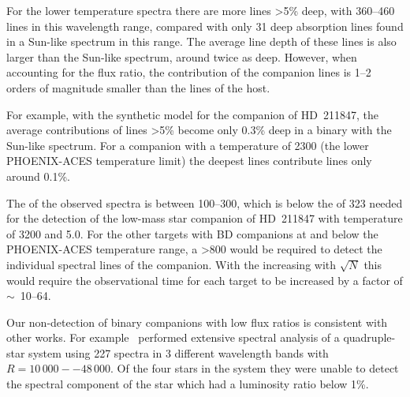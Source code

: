 For the lower temperature spectra there are more lines >5\% deep, with 360--460 lines in this wavelength range, compared with only 31 deep absorption lines found in a Sun-like spectrum in this range.
The average line depth of these lines is also larger than the Sun-like spectrum, around twice as deep.
However, when accounting for the flux ratio, the contribution of the companion lines is 1--2 orders of magnitude smaller than the lines of the host.

For example, with the synthetic model for the companion of {HD~211847}, the average contributions of lines >5\% become only 0.3\% deep in a binary with the Sun-like spectrum.
For a companion with a temperature of 2300\K{} (the lower {PHOENIX-ACES} temperature limit) the deepest lines contribute lines only around 0.1\%.


The \snr{} of the observed spectra is between 100--300, which is below the \snr{} of 323 needed for the detection of the low-mass star companion of {HD~211847} with temperature of 3200\K{} and \logg{} 5.0.
For the other targets with {BD} companions at and below the {PHOENIX-ACES} temperature range, a \snr{} >800  would be required to detect the individual spectral lines of the companion.
With the \snr{} increasing with \(\sqrt{N}\) this would require the observational time for each target to be increased by a factor of \(\sim\)~10--64.

Our non-detection of binary companions with low flux ratios is consistent with other works.
For example~\citet{nemravova_xtauri_2016} performed extensive spectral analysis of a quadruple-star system  using 227 spectra in 3 different wavelength bands with \(R=10\,000--48\,000\).
Of the four stars in the system they were unable to detect the spectral component of the star which had a luminosity ratio below 1\%.




